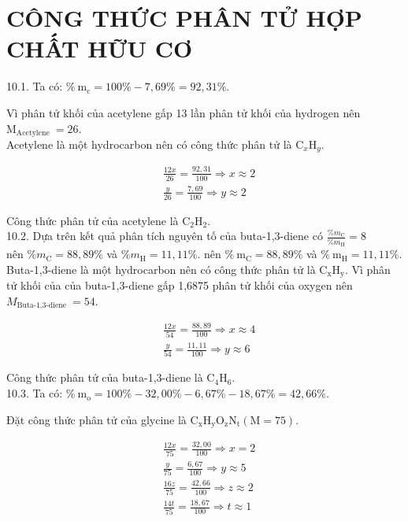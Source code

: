 \documentclass[10pt]{article}
\begin{document}
\section*{CÔNG THỨC PHÂN TỬ HỢP CHẤT HỮU CƠ}
10.1. Ta có: $\% \mathrm{~m}_{\mathrm{c}}=100 \%-7,69 \%=92,31 \%$.

Vì phân tử khối của acetylene gấp 13 lần phân tử khối của hydrogen nên $\mathrm{M}_{\text {Acetylene }}=26$.\\
Acetylene là một hydrocarbon nên có công thức phân tử là $\mathrm{C}_{x} \mathrm{H}_{y}$.

$$
\begin{aligned}
& \frac{12 x}{26}=\frac{92,31}{100} \Rightarrow x \approx 2 \\
& \frac{y}{26}=\frac{7,69}{100} \Rightarrow y \approx 2
\end{aligned}
$$

Công thức phân tử của acetylene là $\mathrm{C}_{2} \mathrm{H}_{2}$.\\
10.2. Dựa trên kết quả phân tích nguyên tố của buta-1,3-diene có $\frac{\% m_{\mathrm{C}}}{\% m_{\mathrm{H}}}=8$\\
nên $\% m_{\mathrm{C}}=88,89 \%$ và $\% m_{\mathrm{H}}=11,11 \%$. nên $\% \mathrm{~m}_{\mathrm{C}}=88,89 \%$ và $\% \mathrm{~m}_{\mathrm{H}}=11,11 \%$.\\
Buta-1,3-diene là một hydrocarbon nên có công thức phân tử là $\mathrm{C}_{\mathrm{x}} \mathrm{H}_{\mathrm{y}}$. Vì phân tử khối của của buta-1,3-diene gấp 1,6875 phân tử khối của oxygen nên $M_{\text {Buta-1,3-diene }}=54$.

$$
\begin{aligned}
& \frac{12 x}{54}=\frac{88,89}{100} \Rightarrow x \approx 4 \\
& \frac{y}{54}=\frac{11,11}{100} \Rightarrow y \approx 6
\end{aligned}
$$

Công thức phân tử của buta-1,3-diene là $\mathrm{C}_{4} \mathrm{H}_{6}$.\\
10.3. Ta có: $\% \mathrm{~m}_{\mathrm{o}}=100 \%-32,00 \%-6,67 \%-18,67 \%=42,66 \%$.

Đặt công thức phân tử của glycine là $\mathrm{C}_{\mathrm{x}} \mathrm{H}_{\mathrm{y}} \mathrm{O}_{\mathrm{z}} \mathrm{N}_{\mathrm{t}}(\mathrm{M}=75)$.

$$
\begin{aligned}
& \frac{12 x}{75}=\frac{32,00}{100} \Rightarrow x=2 \\
& \frac{y}{75}=\frac{6,67}{100} \Rightarrow y \approx 5 \\
& \frac{16 z}{75}=\frac{42,66}{100} \Rightarrow z \approx 2 \\
& \frac{14 t}{75}=\frac{18,67}{100} \Rightarrow t \approx 1
\end{aligned}
$$
\end{document}
